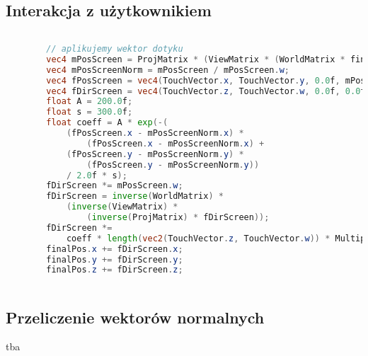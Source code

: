 		\subsection{Interakcja z użytkownikiem}
		\label{t:symulacja:dzialanie:interakcja}
			
		
		\begin{lstlisting}[language=GLSL]
		
		// aplikujemy wektor dotyku
		vec4 mPosScreen = ProjMatrix * (ViewMatrix * (WorldMatrix * finalPos));
		vec4 mPosScreenNorm = mPosScreen / mPosScreen.w;
		vec4 fPosScreen = vec4(TouchVector.x, TouchVector.y, 0.0f, mPosScreenNorm.w);
		vec4 fDirScreen = vec4(TouchVector.z, TouchVector.w, 0.0f, 0.0f);
		float A = 200.0f;
		float s = 300.0f;
		float coeff = A * exp(-(
			(fPosScreen.x - mPosScreenNorm.x) * 
				(fPosScreen.x - mPosScreenNorm.x) +
			(fPosScreen.y - mPosScreenNorm.y) * 
				(fPosScreen.y - mPosScreenNorm.y)) 
			/ 2.0f * s);
		fDirScreen *= mPosScreen.w;
		fDirScreen = inverse(WorldMatrix) * 
			(inverse(ViewMatrix) * 
				(inverse(ProjMatrix) * fDirScreen));
		fDirScreen *= 
			coeff * length(vec2(TouchVector.z, TouchVector.w)) * Multipliers.x;
		finalPos.x += fDirScreen.x;
		finalPos.y += fDirScreen.y;
		finalPos.z += fDirScreen.z;
		
		\end{lstlisting}
			
		\subsection{Przeliczenie wektorów normalnych}
		\label{t:symulacja:dzialanie:normalne}
			
	
		tba
		
	

